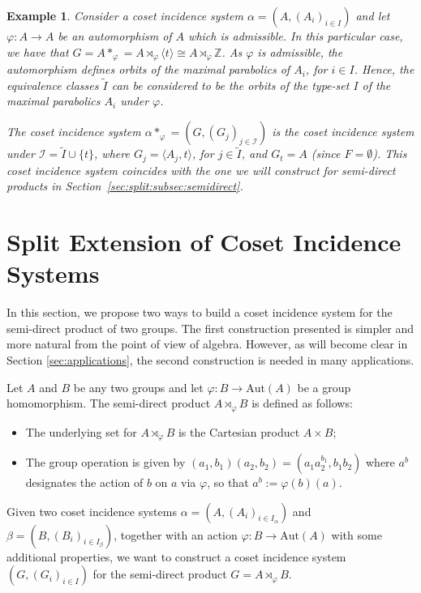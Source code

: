 \documentclass[11pt,letterpaper]{amsart}
\newtheorem{example}[prop]{Example}
\newcommand{\II}{\mathcal{I}}
\newcommand{\Aut}{\mathrm{Aut}}
\begin{document}
\begin{example}\label{example:SemiDirectProduct}
Consider a coset incidence system $\alpha=(A,(A_i)_{i\in I})$ and let $\varphi: A\to A$ be an automorphism of $A$ which is admissible.
In this particular case, we have that $G = A*_\varphi = A\rtimes_\varphi \langle t\rangle\cong A\rtimes_\varphi \mathbb{Z}$.
As $\varphi$ is admissible,  the automorphism defines orbits of the maximal parabolics of $A_i$, for $i\in I$. Hence, the equivalence classes $\widetilde{I}$ can be considered to be the orbits of the type-set $I$ of the maximal parabolics $A_i$ under $\varphi$. 

The coset incidence system $\alpha*_\varphi = (G,(G_j)_{j\in \II})$ is the coset incidence system under $\II =\widetilde{I}\cup \{t\}$, where $G_j = \langle A_j,t\rangle$, for $j\in \widetilde{I}$, and $G_t = A$ (since $F = \emptyset$). This coset incidence system coincides with the one we will construct for semi-direct products in Section~\ref{sec:split:subsec:semidirect}.    

\end{example}



\section{Split Extension of Coset Incidence Systems}\label{sec:SplitExt}

In this section, we propose two ways to build a coset incidence system for the semi-direct product of two groups. The first construction presented is simpler and more natural from the point of view of algebra. However, as will become clear in Section \ref{sec:applications}, the second construction is needed in many applications.

Let $A$ and $B$ be any two groups and let $\varphi \colon B \to \Aut(A)$ be a group homomorphism. The semi-direct product $A \rtimes_\varphi B$ is defined as follows:

\begin{itemize}
    \item The underlying set for $A \rtimes_\varphi B$ is the Cartesian product $A \times B$;
    \item The group operation is given by $(a_1,b_1) (a_2,b_2) = (a_1 a_2^{b_1}, b_1b_2)$ where $a^b$ designates the action of $b$ on $a$ via $\varphi$, so that $a^b:=\varphi(b)(a)$.
\end{itemize}

Given two coset incidence systems $\alpha = (A,(A_i)_{i \in I_\alpha})$ and $\beta = (B,(B_i)_{i \in I_\beta})$, together with an action $\varphi \colon B \to \Aut(A)$ with some additional properties, we want to construct a coset incidence system $(G,(G_i)_{i \in I})$ for the semi-direct product $G = A \rtimes_\varphi B$.
\end{document}
